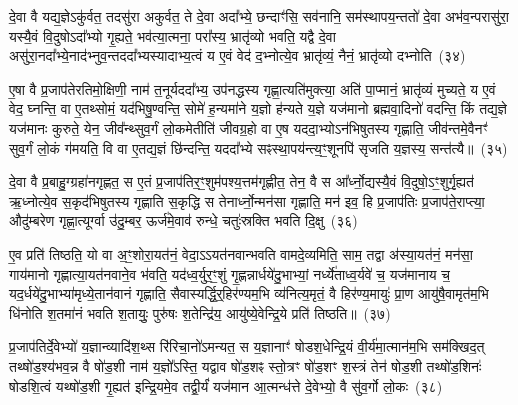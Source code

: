 {\anuvakamend[{उ॒क्थ्ये॑ दे॒वा अ॒मुष्मिँ॑ल्लो॒क एका॒न्नच॑त्वारि॒ꣳ॒शच्च॑}]}

दे॒वा वै यद्य॒ज्ञे\-ऽकु॑र्वत॒ तदसु॑रा अकुर्वत॒ ते दे॒वा अदा᳚भ्ये॒ छन्दाꣳ॑सि॒ सव॑नानि॒ सम॑स्थापय॒न्ततो॑ दे॒वा अभ॑व॒न्परासु॑रा॒ यस्यै॒वं वि॒दुषो\-ऽदा᳚भ्यो गृ॒ह्यते॒ भव॑त्या॒त्मना॒ परा᳚स्य॒ भ्रातृ॑व्यो भवति॒ यद्वै दे॒वा असु॑रा॒नदा᳚भ्ये॒ना\-द॑भ्नुव॒न्तददा᳚भ्यस्यादाभ्य॒त्वं य ए॒वं वेद॑ द॒भ्नोत्ये॒व भ्रातृ॑व्यं॒ नैनं॒ भ्रातृ॑व्यो दभ्नोति~(३४)\ip

ए॒षा वै प्र॒जा\-प॑तेरतिमो॒क्षिणी॒ नाम॑ त॒नूर्यददा᳚भ्य॒ उप॑नद्धस्य गृह्णा॒त्यति॑मुक्त्या॒ अति॑ पा॒प्मानं॒ भ्रातृ॑व्यं मुच्यते॒ य ए॒वं वेद॒ घ्नन्ति॒ वा ए॒तथ्सोमं॒ यद॑भिषु॒ण्वन्ति॒ सोमे॑ ह॒न्यमा॑ने य॒ज्ञो ह॑न्यते य॒ज्ञे यज॑मानो ब्रह्मवा॒दिनो॑ वदन्ति॒ किं तद्य॒ज्ञे यज॑मानः कुरुते॒ येन॒ जीव᳚न्थ्सुव॒र्गं लो॒कमेतीति॑ जीवग्र॒हो वा ए॒ष यददा॒भ्यो\-ऽन॑भिषुतस्य गृह्णाति॒ जीव॑न्तमे॒वैनꣳ॑ सुव॒र्गं लो॒कं ग॑मयति॒ वि वा ए॒तद्य॒ज्ञं छि॑न्दन्ति॒ यददा᳚भ्ये सꣴस्था॒पय॑न्त्य॒ꣳ॒शूनपि॑ सृजति य॒ज्ञस्य॒ सन्त॑त्यै॥~(३५)\ip

{\anuvakamend[{द॒भ्नो॒त्यन॑भिषुतस्य गृह्णा॒त्येका॒न्नविꣳ॑श॒तिश्च॑}]}

दे॒वा वै प्र॒बाहु॒ग्ग्रहा॑नगृह्णत॒ स ए॒तं प्र॒जा\-प॑तिर॒ꣳ॒शुम॑पश्य॒त्तम॑गृह्णीत॒ तेन॒ वै स आ᳚र्ध्नो॒द्यस्यै॒वं वि॒दुषो॒\-ऽꣳ॒शुर्गृ॒ह्यत॑ ऋ॒ध्नोत्ये॒व स॒कृद॑भिषुतस्य गृह्णाति स॒कृद्धि स तेनार्ध्नो॒न्मन॑सा गृह्णाति॒ मन॑ इव॒ हि प्र॒जा\-प॑तिः प्र॒जा\-प॑ते॒राप्त्या॒ औदु॑म्बरेण गृह्णा॒त्यूर्ग्वा उ॑दु॒म्बर॒ ऊर्ज॑मे॒वाव॑ रुन्धे॒ चतुः॑स्रक्ति भवति दि॒क्षु~(३६)\ip

ए॒व प्रति॑ तिष्ठति॒ यो वा अ॒ꣳ॒शोरा॒यत॑नं॒ वेदा॒\-ऽऽ\-यत॑नवान्भवति वामदे॒व्यमिति॒ साम॒ तद्वा अ॑स्या॒यत॑नं॒ मन॑सा॒ गाय॑मानो गृह्णात्या॒यत॑नवाने॒व भ॑वति॒ यद॑ध्व॒र्युर॒ꣳ॒शुं गृ॒ह्णन्नार्धये॑दु॒भाभ्यां॒ नर्ध्ये॑ताध्व॒र्यवे॑ च॒ यज॑मानाय च॒ यद॒र्धये॑दु॒भाभ्या॑मृध्ये॒तान॑वानं गृह्णाति॒ सैवास्यर्द्धि॒र्॒\mbox{}हिर॑ण्यम॒भि व्य॑नित्य॒मृतं॒ वै हिर॑ण्य॒मायुः॑ प्रा॒ण आयु॑षै॒वामृत॑म॒भि धि॑नोति श॒तमा॑नं भवति श॒तायुः॒ पुरु॑षः श॒तेन्द्रि॑य॒ आयु॑ष्ये॒वेन्द्रि॒ये प्रति॑ तिष्ठति॥~(३७)\ip

{\anuvakamend[{दि॒क्ष्व॑निति विꣳश॒तिश्च॑}]}%

प्र॒जा\-प॑तिर्दे॒वेभ्यो॑ य॒ज्ञान्व्यादि॑श॒थ्स रि॑रिचा॒नो॑\-ऽमन्यत॒ स य॒ज्ञानाꣳ॑ षोडश॒धेन्द्रि॒यं वी॒र्य॑मा॒त्मान॑म॒भि सम॑क्खिद॒त् तथ्षो॑ड॒श्य॑भव॒न्न वै षो॑ड॒शी नाम॑ य॒ज्ञो᳚\-ऽस्ति॒ यद्वाव षो॑ड॒शꣴ स्तो॒त्रꣳ षो॑ड॒शꣳ श॒स्त्रं तेन॑ षोड॒शी तथ्षो॑ड॒शिनः॑ षोडशि॒त्वं यथ्षो॑ड॒शी गृ॒ह्यत॑ इन्द्रि॒यमे॒व तद्वी॒र्यं॑ यज॑मान आ॒त्मन्ध॑त्ते दे॒वेभ्यो॒ वै सु॑व॒र्गो लो॒कः~(३८)\ip

